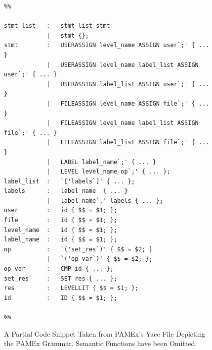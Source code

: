 \begin{figure}[htb]
    \centering
    \begin{tcolorbox}[width=\textwidth, boxsep=5pt, sharp corners, colback=white, colframe=black, fontupper=\footnotesize\ttfamily] %
        \begin{minipage}{\textwidth} %
            \begin{lstlisting}
%%

stmt_list   : 	stmt_list stmt
            |	stmt {};
stmt        :	USERASSIGN level_name ASSIGN user`;' { ... }
            |	USERASSIGN level_name label_list ASSIGN user`;'	{ ... }
            |	USERASSIGN label_list ASSIGN user`;' { ... }
            |	FILEASSIGN level_name ASSIGN file`;' { ... }
            |   FILEASSIGN level_name label_list ASSIGN file`;' { ... }
            |	FILEASSIGN label_list ASSIGN file`;' { ... }
            |	LABEL label_name`;' { ... }
            |	LEVEL level_name op`;' { ... };
label_list  :	`['labels`]' { ... };
labels      :	label_name  { ... }
            |	label_name`,' labels { ... };	
user        :	id { $$ = $1; };
file        :	id { $$ = $1; };
level_name  :	id { $$ = $1; };
label_name  :	id { $$ = $1; };	
op          :	`('set_res`)' { $$ = $2; }
            |	`('op_var`)' { $$ = $2; };	
op_var      :	CMP id { ... };
set_res     :	SET res { ... };
res         :	LEVELLIT { $$ = $1; };
id          : 	ID { $$ = $1; };

%%
            \end{lstlisting}
        \end{minipage}
    \end{tcolorbox}
    \caption[Code Snippet from PAMEx Yacc File]{\label{yacc}A Partial Code Snippet Taken from PAMEx's Yacc File Depicting the PAMEx Grammar. Semantic Functions have been Omitted.}
\end{figure}

\vspace{\baselineskip}

